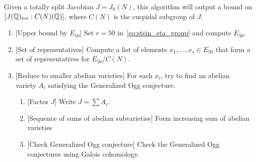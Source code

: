 \begin{algorithm}%
    Given a totally split Jacobian $J=J_0(N)$, this algorithm will output a
    bound on $[J(\mathbb{Q})_{\mathrm{tor}}:C(N)(\mathbb{Q})]$, where $C(N)$ is the cuspidal subgroup
    of $J$.
    \begin{enumerate}
        \item{} [Upper bound by $E_{50}$]
            Set $r=50$ in~\eqref{eq:stein_eta_group} and compute $E_{50}$.
        \item{} [Set of representatives]
            Compute a list of elements $x_1,\ldots,x_s\in E_{50}$ that form a
            set of representatives for $E_{50}/C(N)$.
        \item{} [Reduce to smaller abelian varieties]
            For each $x_i$, try to find an abelian variety $A_i$ satisfying the
            Generalized Ogg conjecture.
            \begin{enumerate}
                \item{} [Factor $J$]
                    Write $J=\sum A_i$.
                \item{} [Sequence of sums of abelian subvarieties]
                    Form increasing sum of abelian varieties
                \item{} [Check Generalized Ogg conjecture]
                    Check the Generalized Ogg conjectures using Galois
                    cohomology.
            \end{enumerate}
    \end{enumerate}
\end{algorithm}
